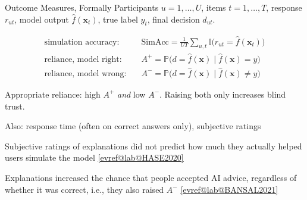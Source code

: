 \documentclass[10pt,compress,t,notes=noshow,xcolor=table]{beamer}
\makeatletter
\providecommand{\xv}{\mathbf{x}}
\providecommand{\fh}{\hat{f}}
\renewcommand{\P}{\mathds{P}}
\providecommand{\I}{\mathbb{I}}
\newcommand{\citeref}[1]{%
  \href{\csname evref@url@#1\endcsname}{[\csname evref@lab@#1\endcsname]}}
\makeatother
\begin{document}
\begin{framev}[align=top]{Outcome Measures, Formally}
Participants $u = 1,\dots,U$, items $t = 1,\dots,T$, response $r_{ut}$, model output $\fh(\xv_t)$, true label $y_t$, final decision $d_{ut}$.
\begin{definition}
\vspace{-0.4em}
\begin{align*}
\text{simulation accuracy:} \quad & \mathrm{SimAcc} = \tfrac{1}{UT}\textstyle\sum_{u,t}\I\big(r_{ut} = \fh(\xv_t)\big)\\
\text{reliance, model right:} \quad & A^+ = \P\big(d = \fh(\xv) \mid \fh(\xv) = y\big)\\
\text{reliance, model wrong:} \quad & A^- = \P\big(d = \fh(\xv) \mid \fh(\xv) \neq y\big)
\end{align*}
\end{definition}
\begin{itemizeS}
\item Appropriate reliance: high $A^+$ \emph{and} low $A^-$. Raising both only increases blind trust.
\item Also: response time (often on correct answers only), subjective ratings
\end{itemizeS}
\pause
\begin{itemizeS}
\item Subjective ratings of explanations did not predict how much they actually helped users simulate the model \citeref{HASE2020}
\item Explanations increased the chance that people accepted AI advice, regardless of whether it was correct, i.e., they also raised $A^-$ \citeref{BANSAL2021}
\end{itemizeS}
\end{framev}
\end{document}
